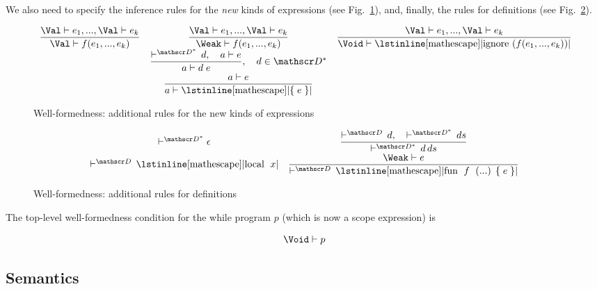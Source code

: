 \documentclass{article}
\newcommand{\trule}[2]{\dfrac{#1}{#2}}
\newcommand{\withenv}[2]{{#1}\vdash{#2}}
\newcommand{\llang}[1]{\mbox{\lstinline[mathescape]|#1|}}
\theoremstyle{definition}
\begin{document}
We also need to specify the inference rules for the \emph{new} kinds of expressions (see Fig.~\ref{well_formed_new}),
and, finally, the rules for definitions (see Fig.~\ref{well_formed_def}).


\begin{figure}[h]
\renewcommand{\arraystretch}{2}
\[
  \begin{array}{ccc}
  \trule{\withenv{\Val}{e_1},...,\withenv{\Val}{e_k}}
        {\withenv{\Val}{f (e_1,...,e_k)}} &   \trule{\withenv{\Val}{e_1},...,\withenv{\Val}{e_k}}
                                                    {\withenv{\Weak}{f (e_1,...,e_k)}} & \trule{\withenv{\Val}{e_1},...,\withenv{\Val}{e_k}}
                                                    {\withenv{\Void}{\llang{ignore ($f (e_1,...,e_k)$)}}} \\[2mm]
                                         & \trule{\vdash^{\mathscr D^*}\,d,\quad \withenv{a}{e}}
                                                    {\withenv{a}{d\;e}},\quad d\in\mathscr D^* & \\[2mm]
                                         & \trule{\withenv{a}{e}}
                                                    {\withenv{a}{\llang{\{$\;e\;$\}}}} &
  \end{array}
  \]
  \caption{Well-formedness: additional rules for the new kinds of expressions}
  \label{well_formed_new}
\end{figure}

\begin{figure}[h]
\renewcommand{\arraystretch}{2}
\[
   \begin{array}{cc}
    \vdash^{\mathscr D^*}{\epsilon} & \trule{\vdash^{\mathscr D}\,d,\quad \vdash^{\mathscr D^*}\,ds}{\vdash^{\mathscr D^*}\,{d\,ds}} \\[2mm]
    \vdash^{\mathscr D}\,\llang{local $\;x$} & \trule{\withenv{\Weak}{e}}
                                                   {\vdash^{\mathscr D}\,\llang{fun $\;f\;$ (...) \{$\;e\;$\}}}
  \end{array}
  \]
  \caption{Well-formedness: additional rules for definitions}
  \label{well_formed_def}
\end{figure}


The top-level well-formedness condition for the while program $p$ (which is now a scope expression) is

\[
\withenv{\Void}{p}
\]

\subsection{Semantics}
\end{document}
